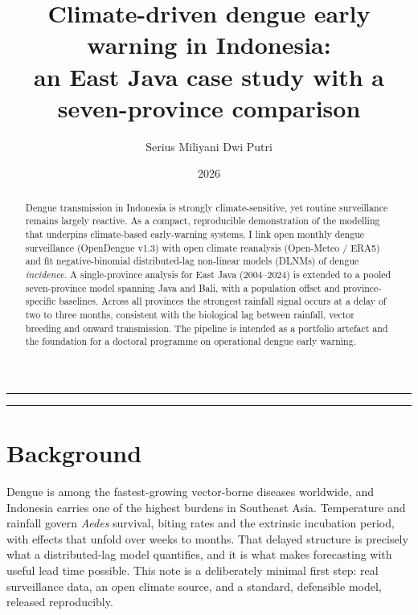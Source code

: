 \documentclass[11pt]{article}
\title{\textbf{Climate-driven dengue early warning in Indonesia:\\
an East Java case study with a seven-province comparison}}
\author[ ]{Serius Miliyani Dwi Putri}
\affil[ ]{\small M.Ked.Trop (Epidemiology, Tropical Medicine)\\
Research Manager, Climate and Health Centre, Universitas Brawijaya\\
\texttt{Proof-of-concept analysis}}
\date{\small 2026}
\begin{document}
\maketitle

\vspace{-1.2em}
\noindent\rule{\textwidth}{0.4pt}
\begin{abstract}
\noindent Dengue transmission in Indonesia is strongly climate-sensitive, yet
routine surveillance remains largely reactive. As a compact, reproducible
demonstration of the modelling that underpins climate-based early-warning
systems, I link open monthly dengue surveillance (OpenDengue v1.3) with open
climate reanalysis (Open-Meteo / ERA5) and fit negative-binomial distributed-lag
non-linear models (DLNMs) of dengue \emph{incidence}. A single-province analysis
for East Java (2004--2024) is extended to a pooled seven-province model spanning
Java and Bali, with a population offset and province-specific baselines. Across
all provinces the strongest rainfall signal occurs at a delay of two to three
months, consistent with the biological lag between rainfall, vector breeding and
onward transmission. The pipeline is intended as a portfolio artefact and the
foundation for a doctoral programme on operational dengue early warning.
\end{abstract}
\noindent\rule{\textwidth}{0.4pt}

\section{Background}
Dengue is among the fastest-growing vector-borne diseases worldwide, and
Indonesia carries one of the highest burdens in Southeast Asia. Temperature and
rainfall govern \emph{Aedes} survival, biting rates and the extrinsic incubation
period, with effects that unfold over weeks to months. That delayed structure is
precisely what a distributed-lag model quantifies, and it is what makes
forecasting with useful lead time possible. This note is a deliberately minimal
first step: real surveillance data, an open climate source, and a standard,
defensible model, released reproducibly.
\end{document}
